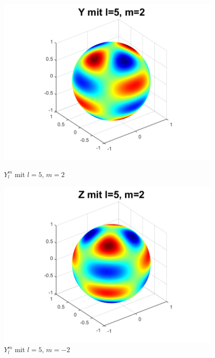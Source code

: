 \begin{figure}
\begin{minipage}[hbt]{0.4\textwidth}
\includegraphics[width=1\textwidth]{chapters/images/ylm/a_5_2.pdf}
\caption{$Y^m_l$ mit $l=5$, $m=2$}
\label{skript:ylm l=5 m=2}
\end{minipage}
\hfill
\begin{minipage}[hbt]{0.4\textwidth}
\centering
\includegraphics[width=1\textwidth]{chapters/images/ylm/b_5_2.pdf}
\caption{$Y^m_l$ mit $l=5$, $m=-2$}
\label{skript:zlm l=5 m=2}
\end{minipage}
\end{figure}

